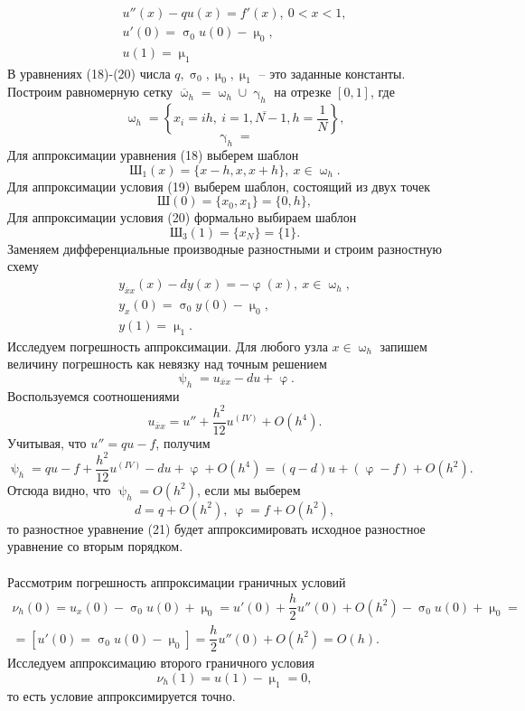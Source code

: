 \documentclass[a4paper, 12pt]{report}
\numberwithin{equation}{section}
\newcommand{\ol}{\overline}
\renewcommand{\gamma}{\upgamma}
\renewcommand{\varphi}{\upvarphi}
\renewcommand{\sigma}{\upsigma}
\renewcommand{\psi}{\uppsi}
\renewcommand{\mu}{\upmu}
\renewcommand{\omega}{\upomega}
\begin{document}
			\begin{eqnarray}
					u''(x) - qu(x) = f'(x),\ 0<x<1,\\
					u'(0) = \sigma_0 u(0) - \mu_0,\\
					u(1) = \mu_1
			\end{eqnarray}
			В уравнениях (18)-(20) числа $q, \sigma_0, \mu_0, \mu_1$ -- это заданные константы. Построим равномерную сетку $\ol \omega_h = \omega_h \cup \gamma_h$ на отрезке $[0,1]$, где
			$$\omega_h = \left\{x_i = ih,\ i = \ol {1,N-1}, h = \dfrac1N\right\},$$
			$$\gamma_h = $$
			Для аппроксимации уравнения (18) выберем шаблон $$\text{Ш}_1(x) = \{x-h, x, x+h\},\ x \in \omega_h.$$
			Для аппроксимации условия (19) выберем шаблон, состоящий из двух точек
			$$\text{Ш}(0) = \{x_0, x_1\} = \{0,h\},$$
			Для аппроксимации условия (20) формально выбираем шаблон
			$$\text{Ш}_3(1) = \{x_N\} = \{1\}.$$
			Заменяем дифференциальные производные разностными и строим разностную схему
			\begin{eqnarray}
				y_{\ol x x}(x) - dy(x) = -\varphi(x),\ x\in \omega_h,\\
				y_x(0) = \sigma_0 y(0) - \mu_0,\\
				y(1) = \mu_1.
			\end{eqnarray}
			Исследуем погрешность аппроксимации. Для любого узла $x \in \omega_h$ запишем величину погрешность как невязку над точным решением
			$$\psi_h = u_{\ol x x} - du + \varphi.$$
			Воспользуемся соотношениями
			$$u_{\ol x x} = u'' + \dfrac{h^2}{12}u^{(IV)} + O(h^4).$$
			Учитывая, что $u'' = qu - f$, получим
			$$\psi_h = qu - f + \dfrac{h^2}{12}u^{(IV)} - du + \varphi + O(h^4) = (q-d)u + (\varphi - f) + O(h^2).$$
			Отсюда видно, что $\psi_h = O(h^2)$, если мы выберем
			$$d = q+ O(h^2),\ \varphi = f + O(h^2),$$ то разностное уравнение (21) будет аппроксимировать исходное разностное уравнение со вторым порядком. \\\\
			Рассмотрим погрешность аппроксимации граничных условий
			\begin{multline*}
				\nu_h(0) = u_x(0) - \sigma_0 u(0) + \mu_0 = u'(0) + \dfrac h2 u''(0) + O(h^2) - \sigma_0 u(0) + \mu_0 =\\= [u'(0) =\sigma_0 u(0) - \mu_0] = \dfrac{h}{2}u''(0) + O(h^2) = O(h).
			\end{multline*}
			Исследуем аппроксимацию второго граничного условия
			$$\nu_h(1) = u(1) - \mu_1 = 0,$$
			то есть условие аппроксимируется точно.\\\\
\end{document}
